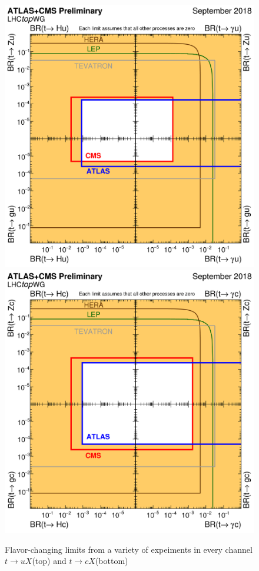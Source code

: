 \begin{figure}[h!]
	\centering
	\includegraphics[width=.5\columnwidth]{../ThesisImages/Theory/fcnc_tXu_sep18.png}
	\includegraphics[width=.5\columnwidth]{../ThesisImages/Theory/fcnc_tXc_sep18.png}
	\caption[Flavor-changing limits from a variety of expeiments in every channel $t\rightarrow uX$(top) and $t\rightarrow cX$(bottom)]{Flavor-changing limits from a variety of expeiments in every channel $t\rightarrow uX$(top) and $t\rightarrow cX$(bottom) \cite{TopWG}}
	\label{fig:FCNCLimsBox}
\end{figure}

